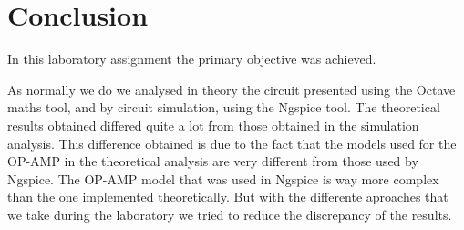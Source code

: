 \section{Conclusion}
\label{sec:conclusion}

In this laboratory assignment the primary objective  was achieved.\par
As normally we do we analysed in theory the circuit presented using the Octave maths tool, and by circuit simulation, using the
Ngspice tool. The theoretical results obtained differed quite a lot from those obtained in the simulation analysis. This difference obtained is due to the fact that the models used for the OP-AMP in the theoretical analysis are very different from those used by Ngspice. The OP-AMP model that was used in Ngspice is way more complex than the one implemented theoretically. But with the differente aproaches that we take during the laboratory we tried to reduce the discrepancy of the results.


